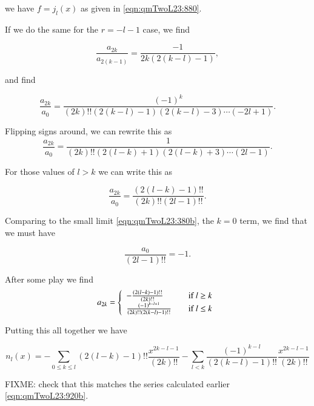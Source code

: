 we have $f = j_l(x)$ as given in \ref{eqn:qmTwoL23:880}.

If we do the same for the $r = -l-1$ case, we find

\begin{equation}\label{eqn:qmTwoL23:1100b}
\frac{
a_{2k} 
}{a_{2(k-1)}}
= 
\frac{-1}{
2k (2 (k-l) - 1) 
},
\end{equation}

and find

\begin{equation}\label{eqn:qmTwoL23:1160}
\frac{a_{2k}}{a_0} = 
\frac{(-1)^k}{(2k)!! (2(k-l) -1)(2(k-l)-3)\cdots(-2l + 1)}.
\end{equation}

Flipping signs around, we can rewrite this as
\begin{equation}\label{eqn:qmTwoL23:1200}
\frac{
a_{2k} 
}{a_0}
= 
\frac{1}{
(2k)!! 
(2(l-k) + 1) (2(l-k) + 3) \cdots (2 l - 1)
}.
\end{equation}

For those values of $l > k$ we can write this as

\begin{equation}\label{eqn:qmTwoL23:1220}
\frac{
a_{2k} 
}{a_0}
= 
\frac{(2(l-k)-1)!!}{
(2k)!! (2 l - 1)!!
}.
\end{equation}

Comparing to the small limit \ref{eqn:qmTwoL23:380b}, the $k=0$ term, we find that we must have

\begin{equation}\label{eqn:qmTwoL23:1240}
\frac{a_0}{(2 l - 1)!!} = -1.
\end{equation}

After some play we find
\begin{equation}\label{eqn:qmTwoL23:1230}
a_{2k}
= 
\left\{
\begin{array}{l l}
-\frac{(2(l-k)-1)!!}{ (2k)!!  } & \quad \mbox{if $l \ge k$} \\
\frac{(-1)^{k-l+1}}{ (2k)!! (2 (k-l) -1)!! } & \quad \mbox{if $l \le k$} \\
\end{array}
\right.
\end{equation}

Putting this all together we have

\begin{equation}\label{eqn:qmTwoL23:1180}
n_l(x) =
-\sum_{0 \le k \le l}
(2(l-k)-1)!!
\frac{x^{2k -l -1}}{(2k)!!}
-\sum_{l < k}
\frac{(-1)^{k-l}} { (2 (k-l) -1)!! }
\frac{x^{2k -l -1}}{(2k)!!}
\end{equation}

FIXME: check that this matches the series calculated earlier \ref{eqn:qmTwoL23:920b}.

\EndArticle

